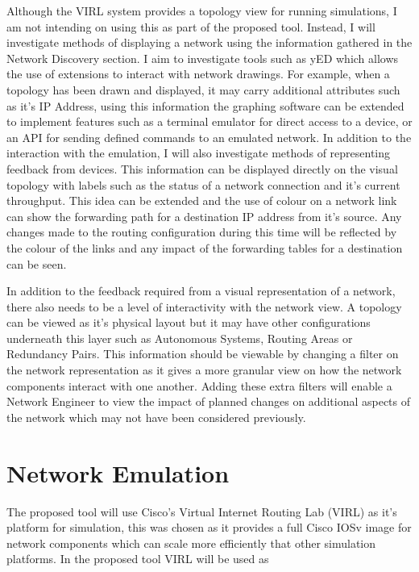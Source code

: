 \documentclass[11pt]{report}
\begin{document}
Although the VIRL system provides a topology view for running simulations, I am not intending on using this as part of the proposed tool. Instead, I will investigate methods of displaying a network using the information gathered in the Network Discovery section. I aim to investigate tools such as yED which allows the use of extensions to interact with network drawings. For example, when a topology has been drawn and displayed, it may carry additional attributes such as it's IP Address, using this information the graphing software can be extended to implement features such as a terminal emulator for direct access to a device, or an API for sending defined commands to an emulated network. In addition to the interaction with the emulation, I will also investigate methods of representing feedback from devices. This information can be displayed directly on the visual topology with labels such as the status of a network connection and it's current throughput. This idea can be extended and the use of colour on a network link can show the forwarding path for a destination IP address from it's source. Any changes made to the routing configuration during this time will be reflected by the colour of the links and any impact of the forwarding tables for a destination can be seen.

In addition to the feedback required from a visual representation of a network, there also needs to be a level of interactivity with the network view. A topology can be viewed as it's physical layout but it may have other configurations underneath this layer such as Autonomous Systems, Routing Areas or Redundancy Pairs. This information should be viewable by changing a filter on the network representation as it gives a more granular view on how the network components interact with one another. Adding these extra filters will enable a Network Engineer to view the impact of planned changes on additional aspects of the network which may not have been considered previously.

\section{Network Emulation}

The proposed tool will use Cisco's Virtual Internet Routing Lab (VIRL) as it's platform for simulation, this was chosen as it provides a full Cisco IOSv image for network components which can scale more efficiently that other simulation platforms. In the proposed tool VIRL will be used as 
      
\end{document}
